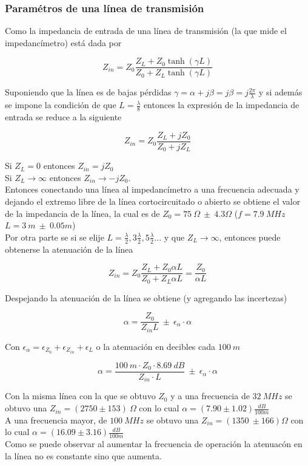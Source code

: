 \documentclass[a4paper,10pt]{article}
\begin{document}
		\subsubsection{Param\'etros de una l\'inea de transmisi\'on}
		
		\indent Como la impedancia de entrada de una l\'inea de transmisi\'on 
		(la que mide el impedanc\'imetro) est\'a dada por 
		
		$$Z_{in}=Z_0\frac{Z_L+Z_0\tanh(\gamma L)}{Z_0+Z_L\tanh(\gamma L)}$$
		
		\indent Suponiendo que la l\'inea es de bajas p\'erdidas 
		$\gamma=\alpha+j\beta=j\beta=j\frac{2\pi}{\lambda}$ y si adem\'as se 
		impone la condici\'on de que $L=\frac{\lambda}{8}$ entonces la 
		expresi\'on de la impedancia de entrada se reduce a la siguiente
		
		$$Z_{in}=Z_0\frac{Z_L+jZ_0}{Z_0+jZ_L}$$
		
		\indent Si $Z_L= 0$ entonces $Z_{in}=jZ_0$ \\
		\indent Si $Z_L \rightarrow \infty$ entonces $Z_{in}\rightarrow-jZ_0$.\\
		\indent Entonces conectando una l\'inea al impedanc\'imetro a una 
		frecuencia adecuada y dejando el extremo libre de la l\'inea 
		cortocircuitado o abierto se obtiene el valor de la impedancia de la 
		l\'inea, la cual es de 
		$Z_0=75~\Omega~\pm~4.3\Omega$ ($f=7.9~MHz$ $L=3~m~\pm~0.05m$) \\
		
		\indent Por otra parte se si se elije 
		$L=\frac{\lambda}{2},3\frac{\lambda}{2}, 5\frac{\lambda}{2} ...$ y que 
		$Z_L\rightarrow\infty$, entonces puede obtenerse la atenuaci\'on de la 
		l\'inea
		
		$$Z_{in}=Z_0\frac{Z_L+Z_0\alpha L}{Z_0+Z_L\alpha L}=\frac{Z_0}{\alpha L}$$
		
		\indent Despejando la atenuaci\'on de la l\'inea se obtiene (y agregando
		las incertezas)
		
		$$\alpha=\frac{Z_0}{Z_{in} L}~\pm~\epsilon_{\alpha}\cdot\alpha$$
		
		\indent Con $\epsilon_{\alpha}=\epsilon_{Z_0}+\epsilon_{Z_{in}}+
		\epsilon_{L}$ o la atenuaci\'on en decibles cada $100~m$
		
		$$\alpha=\frac{100~m\cdot Z_0\cdot8.69~dB}{Z_{in}\cdot L}~\pm~
		\epsilon_{\alpha}\cdot \alpha$$
		
		\indent Con la misma l\'inea con la que se obtuvo $Z_0$ y a una 
		frecuencia de $32~MHz$ se obtuvo una $Z_{in}=(2750\pm153)~\Omega$ con
		lo cual $\alpha = (7.90\pm1.02)\frac{dB}{100m} $ \\
		\indent A una frecuencia mayor, de $100~MHz$ se obtuvo una 
		$Z_{in}=(1350~\pm166)\Omega$ con lo cual 
		$\alpha = (16.09\pm3.16)\frac{dB}{100m}$\\
		\indent Como se puede observar al aumentar la frecuencia de operaci\'on 
		la atenuac\'on en la l\'inea no es constante sino que aumenta.
		
\end{document}
